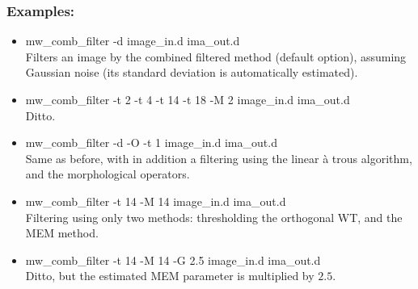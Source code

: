 \subsubsection*{Examples:}
\begin{itemize}
\item mw\_comb\_filter -d image\_in.d ima\_out.d \\
Filters an image by the combined filtered method (default option), assuming
Gaussian noise (its standard deviation is automatically estimated).
\item mw\_comb\_filter -t 2 -t 4 -t 14 -t 18 -M 2 image\_in.d ima\_out.d \\
Ditto. 
\item mw\_comb\_filter -d -O -t 1 image\_in.d ima\_out.d \\
Same as before, with in addition a filtering using the linear \`a trous
 algorithm, and the morphological operators.
\item mw\_comb\_filter -t 14 -M 14 image\_in.d ima\_out.d \\
Filtering using only two methods: thresholding the orthogonal WT, and the MEM 
method.
\item mw\_comb\_filter -t 14 -M 14 -G 2.5 image\_in.d ima\_out.d \\
Ditto, but the estimated MEM parameter is multiplied by $2.5$.
\end{itemize}

